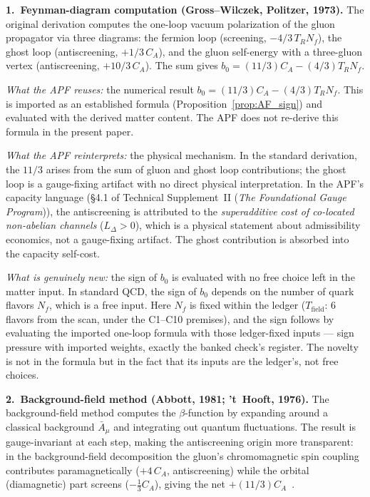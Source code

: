 \documentclass[11pt]{article}
\theoremstyle{definition}
\newcommand{\TSII}{Technical Supplement~II (\emph{The Foundational Gauge Program})}
\begin{document}
\smallskip\noindent\textbf{1.\ Feynman-diagram computation
(Gross--Wilczek, Politzer, 1973).}\quad
The original derivation computes the one-loop vacuum polarization of
the gluon propagator via three diagrams: the fermion loop (screening,
$-4/3\, T_R N_f$), the ghost loop (antiscreening, $+1/3\, C_A$), and
the gluon self-energy with a three-gluon vertex (antiscreening,
$+10/3\, C_A$).  The sum gives $b_0 = (11/3)C_A - (4/3)T_R N_f$.

\textit{What the APF reuses:} the numerical result
$b_0 = (11/3)C_A - (4/3)T_R N_f$.  This is imported as an established
formula (Proposition~\ref{prop:AF_sign}) and evaluated with the
derived matter content.  The APF does not re-derive this formula in
the present paper.

\textit{What the APF reinterprets:} the physical mechanism.  In the
standard derivation, the $11/3$ arises from the sum of gluon and ghost
loop contributions; the ghost loop is a gauge-fixing artifact with no
direct physical interpretation.  In the APF's capacity language
(\S4.1 of \TSII{}), the antiscreening is attributed to the
\emph{superadditive cost of co-located non-abelian channels}
($L_\Delta > 0$), which is a physical statement about admissibility
economics, not a gauge-fixing artifact.  The ghost contribution is
absorbed into the capacity self-cost.

\textit{What is genuinely new:} the sign of $b_0$ is evaluated with
no free choice left in the matter input.  In standard QCD, the sign
of $b_0$ depends on the number of quark flavors $N_f$, which is a
free input.  Here $N_f$ is fixed within the ledger
($T_{\mathrm{field}}$: 6 flavors from the scan, under the C1--C10
premises), and the sign follows by evaluating the imported one-loop
formula with those ledger-fixed inputs --- sign pressure with imported
weights, exactly the banked check's register.  The novelty is not in
the formula but in the fact that its inputs are the ledger's, not
free choices.

\smallskip\noindent\textbf{2.\ Background-field method
(Abbott, 1981; 't~Hooft, 1976).}\quad
The background-field method computes the $\beta$-function by expanding
around a classical background $\bar{A}_\mu$ and integrating out
quantum fluctuations.  The result is gauge-invariant at each step,
making the antiscreening origin more transparent: in the
background-field decomposition the gluon's chromomagnetic spin
coupling contributes paramagnetically ($+4\,C_A$, antiscreening)
while the orbital (diamagnetic) part screens ($-\tfrac{1}{3}C_A$),
giving the net $+(11/3)C_A$~\cite{Hughes1980,Nielsen1981}.
\end{document}
